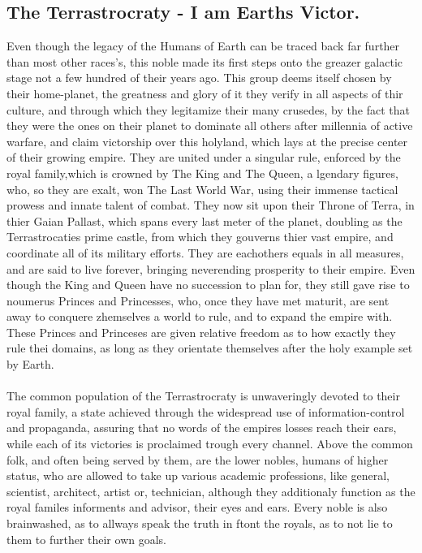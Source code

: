 \documentclass[a4paper,12pt]{book}
\begin{document}
\subsection{The Terrastrocraty -  I am Earths Victor.}
Even though the legacy of the Humans of Earth can be traced back far further than most other races's, this noble made its first steps onto the greazer galactic stage not a few hundred of their years ago. This group deems itself chosen by their home-planet, the greatness and glory of it they verify in all aspects of thir culture, and through which they legitamize their many crusedes, by the fact that they were the ones on their planet to dominate all others after millennia of active warfare, and claim victorship over this holyland, which lays at the precise center of their growing empire. They are united under a singular rule, enforced by the royal family,which is crowned by The King and The Queen, a lgendary figures, who, so they are exalt, won The Last World War, using their immense tactical prowess and innate talent of combat. They now sit upon their Throne of Terra, in thier Gaian Pallast, which spans every last meter of the planet, doubling as the Terrastrocaties prime castle, from which they gouverns thier vast empire, and coordinate all of its military efforts. They are eachothers equals in all  measures, and are said to live forever, bringing neverending prosperity to their empire. Even though the King and Queen have no succession to plan for, they still gave rise to noumerus Princes and Princesses, who, once they have met maturit, are sent away to conquere zhemselves a world to rule, and to expand the empire with. These Princes and Princeses are given relative freedom as to how exactly they rule thei domains, as long as they orientate themselves after the holy example set by Earth. \\
\\
The common population of the Terrastrocraty is unwaveringly devoted to their royal family, a state achieved through the widespread use of information-control and propaganda, assuring that no words of the empires losses reach their ears, while each of its victories is proclaimed trough every channel. Above the common folk, and often being served by them, are the lower nobles, humans of higher status, who are allowed to take up various academic professions, like general, scientist, architect, artist or, technician, although they additionaly function as the royal familes informents and advisor, their eyes and ears. Every noble is also brainwashed, as to allways speak the truth in ftont the royals, as to not lie to them to further their own goals.
\end{document}
